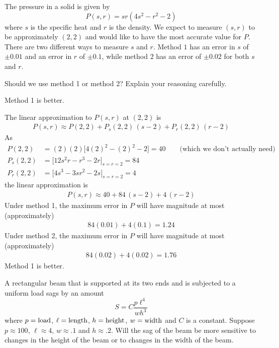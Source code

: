 \begin{question}[M200 2008D] %
The pressure in a solid is given by
\begin{equation*}
P(s,r) = sr(4s^2 - r^2 - 2)
\end{equation*}
where $s$ is the specific heat and $r$ is the density. We expect to measure 
$(s,r)$ to be approximately $(2,2)$ and would like to have the most 
accurate value for $P$.
There are two different ways to measure $s$ and $r$. Method $1$ 
has an error in $s$ of $\pm 0.01$ and an error in $r$ of $\pm 0.1$, 
while method 2 has an error of $\pm 0.02$ for both $s$ and $r$.

Should we use method 1 or method 2? Explain your reasoning carefully.
\end{question}

%

\begin{answer}
Method 1 is better.
\end{answer}

\begin{solution}
The linear approximation to $P(s,r)$ at $(2,2)$ is
\begin{align*}
P(s,r)\approx P(2,2) +P_s(2,2)\,(s-2) + P_r(2,2)\,(r-2)
\end{align*} 
As
\begin{align*}
P(2,2) &= (2)(2)\big[4(2)^2-(2)^2-2\big] = 40
         \qquad\text{(which we don't actually need) } \\
P_s(2,2) &= \Big[12s^2r-r^3-2r\Big]_{s=r=2} = 84 \\
P_r(2,2) &= \Big[4s^3-3sr^2-2s\Big]_{s=r=2} = 4
\end{align*}
the linear approximation is
\begin{align*}
P(s,r)\approx 40 +84\,(s-2) + 4\,(r-2)
\end{align*}
Under method 1, the maximum error in $P$ will have magnitude
at most (approximately)
\begin{align*}
84(0.01) + 4(0.1) = 1.24
\end{align*}
Under method 2, the maximum error in $P$ will have magnitude
at most (approximately)
\begin{align*}
84(0.02) + 4(0.02) = 1.76
\end{align*}
Method 1 is better.
\end{solution}

\begin{question}
A rectangular beam that is supported at its two ends and is subjected
to a uniform load sags by an amount 
\begin{equation*}
S=C\frac{p\ell^4}{w h^3}
\end{equation*}
where $p={\rm load}$, 
      $\ell={\rm length}$, 
      $h={\rm height}$, 
      $w={\rm width}$ and $C$ is a constant. 
Suppose $p\approx 100$, $\ell\approx 4$, $w\approx .1$ and $h\approx.2$. 
Will the sag of the beam be more sensitive to changes in the height of the 
beam or to changes in the width of the beam.
\end{question}

